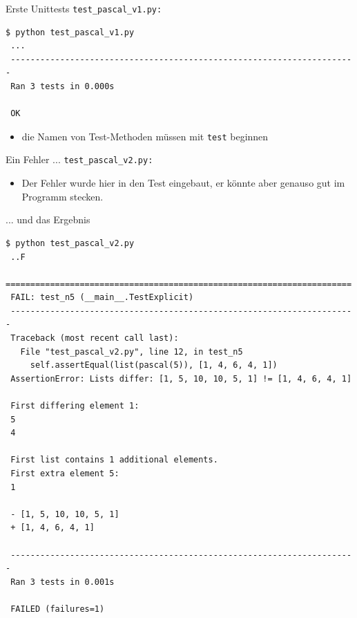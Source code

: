 \documentclass[t, utf8x, 10pt]{beamer}
\begin{document}
\begin{frame}[fragile]{Erste Unittests}
 \texttt{test\_pascal\_v1.py:}
 \begin{scriptsize}
  

  \hrulefill

  \begin{lstlisting}[language={}]
 $ python test_pascal_v1.py 
 ...
 ----------------------------------------------------------------------
 Ran 3 tests in 0.000s
 
 OK
  \end{lstlisting}
 \end{scriptsize}
 \begin{itemize}
	 \item die Namen von Test-Methoden müssen mit \texttt{test} beginnen
 \end{itemize}
\end{frame}


\begin{frame}{Ein Fehler ...}
 \texttt{test\_pascal\_v2.py:}
 \begin{small}
  
 \end{small}
 \begin{itemize}
  \item Der Fehler wurde hier in den Test eingebaut, er könnte aber genauso
        gut im Programm stecken.
 \end{itemize}
\end{frame}


\begin{frame}[fragile]{... und das Ergebnis}
 \begin{scriptsize}
  \begin{lstlisting}[language={}]
 $ python test_pascal_v2.py
 ..F
 ======================================================================
 FAIL: test_n5 (__main__.TestExplicit)
 ----------------------------------------------------------------------
 Traceback (most recent call last):
   File "test_pascal_v2.py", line 12, in test_n5
     self.assertEqual(list(pascal(5)), [1, 4, 6, 4, 1])
 AssertionError: Lists differ: [1, 5, 10, 10, 5, 1] != [1, 4, 6, 4, 1]

 First differing element 1:
 5
 4

 First list contains 1 additional elements.
 First extra element 5:
 1

 - [1, 5, 10, 10, 5, 1]
 + [1, 4, 6, 4, 1]

 ----------------------------------------------------------------------
 Ran 3 tests in 0.001s

 FAILED (failures=1)
  \end{lstlisting}
 \end{scriptsize}
\end{frame}
\end{document}
